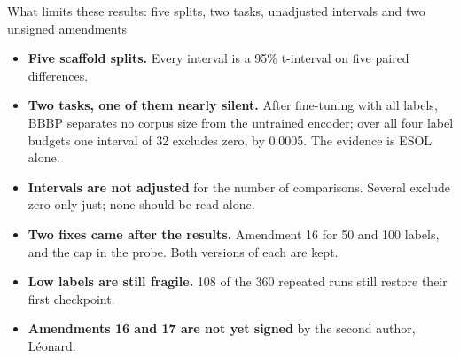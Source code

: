 \documentclass[aspectratio=169,10pt]{beamer}
\begin{document}
\begin{frame}{What limits these results: five splits, two tasks, unadjusted
intervals and two unsigned amendments}
\begin{itemize}
\setlength{\itemsep}{2mm}
\item \textbf{Five scaffold splits.} Every interval is a 95\% t-interval on
five paired differences.
\item \textbf{Two tasks, one of them nearly silent.} After fine-tuning with
all labels, BBBP separates no corpus size from the untrained encoder; over all
four label budgets one interval of 32 excludes zero, by 0.0005. The evidence
is ESOL alone.
\item \textbf{Intervals are not adjusted} for the number of comparisons.
Several exclude zero only just; none should be read alone.
\item \textbf{Two fixes came after the results.} Amendment 16 for 50 and 100
labels, and the cap in the probe. Both versions of each are kept.
\item \textbf{Low labels are still fragile.} 108 of the 360 repeated runs
still restore their first checkpoint.
\item \textbf{Amendments 16 and 17 are not yet signed} by the second author,
L\'eonard.
\end{itemize}
\end{frame}
\end{document}
